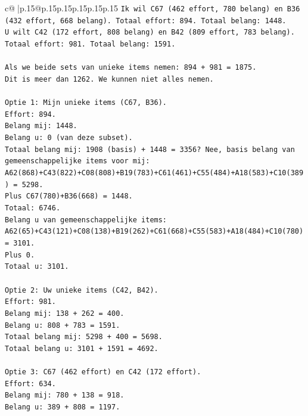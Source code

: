 \documentclass{article}
\begin{document}
{\begin{supertabular}{c@{$\;$}|p{.15\linewidth}@{}p{.15\linewidth}p{.15\linewidth}p{.15\linewidth}p{.15\linewidth}p{.15\linewidth}}
{{{\texttt{Ik wil C67 (462 effort, 780 belang) en B36 (432 effort, 668 belang). Totaal effort: 894. Totaal belang: 1448.} \\
\texttt{U wilt C42 (172 effort, 808 belang) en B42 (809 effort, 783 belang). Totaal effort: 981. Totaal belang: 1591.} \\
\\ 
\texttt{Als we beide sets van unieke items nemen: 894 + 981 = 1875.} \\
\texttt{Dit is meer dan 1262. We kunnen niet alles nemen.} \\
\\ 
\texttt{Optie 1: Mijn unieke items (C67, B36).} \\
\texttt{Effort: 894.} \\
\texttt{Belang mij: 1448.} \\
\texttt{Belang u: 0 (van deze subset).} \\
\texttt{Totaal belang mij: 1908 (basis) + 1448 = 3356? Nee, basis belang van gemeenschappelijke items voor mij:} \\
\texttt{A62(868)+C43(822)+C08(808)+B19(783)+C61(461)+C55(484)+A18(583)+C10(389) = 5298.} \\
\texttt{Plus C67(780)+B36(668) = 1448.} \\
\texttt{Totaal: 6746.} \\
\texttt{Belang u van gemeenschappelijke items:} \\
\texttt{A62(65)+C43(121)+C08(138)+B19(262)+C61(668)+C55(583)+A18(484)+C10(780) = 3101.} \\
\texttt{Plus 0.} \\
\texttt{Totaal u: 3101.} \\
\\ 
\texttt{Optie 2: Uw unieke items (C42, B42).} \\
\texttt{Effort: 981.} \\
\texttt{Belang mij: 138 + 262 = 400.} \\
\texttt{Belang u: 808 + 783 = 1591.} \\
\texttt{Totaal belang mij: 5298 + 400 = 5698.} \\
\texttt{Totaal belang u: 3101 + 1591 = 4692.} \\
\\ 
\texttt{Optie 3: C67 (462 effort) en C42 (172 effort).} \\
\texttt{Effort: 634.} \\
\texttt{Belang mij: 780 + 138 = 918.} \\
\texttt{Belang u: 389 + 808 = 1197.} \\
}}}
\end{supertabular}}
\end{document}
